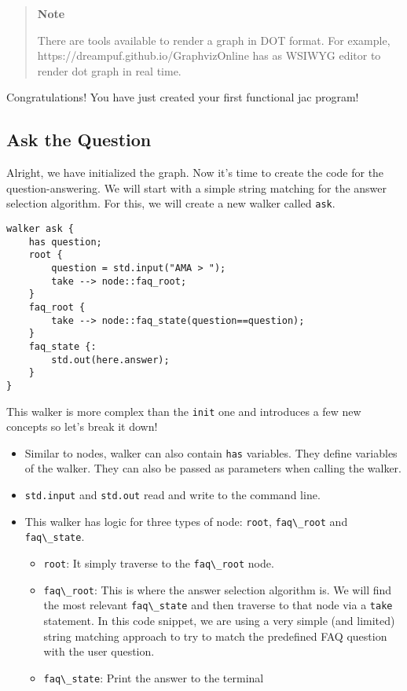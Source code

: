 \begin{quote}
\textbf{Note}

There are tools available to render a graph in DOT format. For example,
https://dreampuf.github.io/GraphvizOnline has as WSIWYG editor to render
dot graph in real time.
\end{quote}

Congratulations! You have just created your first functional jac
program!

\hypertarget{ask-the-question}{%
\subsection{Ask the Question}\label{ask-the-question}}

Alright, we have initialized the graph. Now it's time to create the code
for the question-answering. We will start with a simple string matching
for the answer selection algorithm. For this, we will create a new
walker called \passthrough{\lstinline!ask!}.

\begin{lstlisting}
walker ask {
    has question;
    root {
        question = std.input("AMA > ");
        take --> node::faq_root;
    }
    faq_root {
        take --> node::faq_state(question==question);
    }
    faq_state {:
        std.out(here.answer);
    }
}
\end{lstlisting}

This walker is more complex than the \passthrough{\lstinline!init!} one
and introduces a few new concepts so let's break it down!

\begin{itemize}
\tightlist
\item
  Similar to nodes, walker can also contain
  \passthrough{\lstinline!has!} variables. They define variables of the
  walker. They can also be passed as parameters when calling the walker.
\item
  \passthrough{\lstinline!std.input!} and
  \passthrough{\lstinline!std.out!} read and write to the command line.
\item
  This walker has logic for three types of node:
  \passthrough{\lstinline!root!}, \passthrough{\lstinline!faq\_root!}
  and \passthrough{\lstinline!faq\_state!}.

  \begin{itemize}
  \tightlist
  \item
    \passthrough{\lstinline!root!}: It simply traverse to the
    \passthrough{\lstinline!faq\_root!} node.
  \item
    \passthrough{\lstinline!faq\_root!}: This is where the answer
    selection algorithm is. We will find the most relevant
    \passthrough{\lstinline!faq\_state!} and then traverse to that node
    via a \passthrough{\lstinline!take!} statement. In this code
    snippet, we are using a very simple (and limited) string matching
    approach to try to match the predefined FAQ question with the user
    question.
  \item
    \passthrough{\lstinline!faq\_state!}: Print the answer to the
    terminal
  \end{itemize}
\end{itemize}

